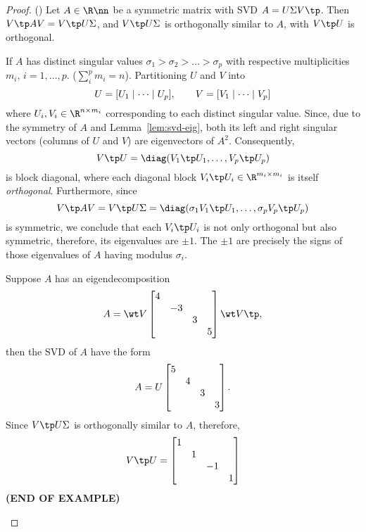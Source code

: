 \documentclass{article}
\renewcommand{\emph}[1]{\textit{\color{purple} #1}}
\begin{document}
\begin{proof}
({\cite[Section~3.1]{dmm03}}) Let $A\in\R\nn$ be a symmetric matrix with
SVD $A = U\Sigma V\tp$. Then $V\tp A V = V\tp U \Sigma$, and $V\tp U\Sigma$
is orthogonally similar to $A$, with $V\tp U$ is orthogonal.

If $A$ has distinct singular values
$\sigma_1 > \sigma_2 > \dots > \sigma_p$ with respective multiplicities
$m_i$, $i=1,\dots,p$. ($\sum_i^pm_i=n$). Partitioning $U$ and $V$ into
\begin{equation}\notag
  U = [  U_1 \mid \dots \mid   U_p], \qquad
  V = [  V_1 \mid \dots \mid   V_p]
\end{equation}
where $  U_i,   V_i \in \R^{n\times m_i}$ corresponding to each
distinct singular value. Since, due to the symmetry of $A$ and
Lemma~\ref{lem:svd-eig}, both its left and right singular vectors (columns
of $U$ and $V$) are eigenvectors of $A^2$. Consequently,
\begin{equation}\notag
  V\tp U = \diag(  V_1\tp   U_1,\dots,   V_p\tp   U_p)
\end{equation}
is block diagonal, where each diagonal block
$  V_i\tp U_i\in \R^{m_{i}\times m_{i}}$ is itself \emph{orthogonal}.
Furthermore, since
\begin{equation}\notag
  V\tp A V = V\tp U \Sigma = \diag(\sigma_1   V_1\tp  
  U_1,\dots,\sigma_p   V_p\tp   U_p)
\end{equation}
is symmetric, we conclude that each $  V_i\tp   U_i$ is not only
orthogonal but also symmetric, therefore, its eigenvalues are $\pm 1$. The
$\pm 1$ are precisely the signs of those eigenvalues of $A$ having modulus
$\sigma_{i}$.

\begin{example}
Suppose $A$ has an eigendecomposition
\begin{equation}\notag
  A = \wt V
  \begin{bmatrix}
    4 & & & \\ & -3 & & \\ & & 3 & \\ & & & 5
  \end{bmatrix} \wt V\tp,
\end{equation}
then the SVD of $A$ have the form
\begin{equation}\notag
  A = U
  \begin{bmatrix}
    5 & & & \\ & 4 & & \\ & & 3 & \\ & & & 3
  \end{bmatrix}.
\end{equation}
Since $V\tp U \Sigma$ is orthogonally similar to $A$, therefore,
\begin{equation}\notag
  V\tp U =
  \begin{bmatrix}
    1 & & & \\ & 1 & & \\ & & -1 & \\ & & & 1
  \end{bmatrix}
\end{equation}
\textbf{(END OF EXAMPLE)}
\end{example}


\end{proof}
\end{document}
